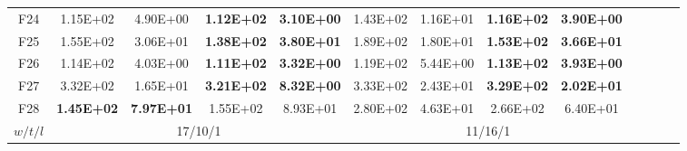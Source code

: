 \begin{table*}[!ht]
\begin{tabular}{|c|cc|cc|cc|cc|cc|cc|}
    F24   & 1.15E+02 & 4.90E+00 & \textbf{1.12E+02} & \textbf{3.10E+00} & 1.43E+02 & 1.16E+01 & \textbf{1.16E+02} & \textbf{3.90E+00} \\
    F25   & 1.55E+02 & 3.06E+01 & \textbf{1.38E+02} & \textbf{3.80E+01} & 1.89E+02 & 1.80E+01 & \textbf{1.53E+02} & \textbf{3.66E+01} \\
    F26   & 1.14E+02 & 4.03E+00 & \textbf{1.11E+02} & \textbf{3.32E+00} & 1.19E+02 & 5.44E+00 & \textbf{1.13E+02} & \textbf{3.93E+00} \\
    F27   & 3.32E+02 & 1.65E+01 & \textbf{3.21E+02} & \textbf{8.32E+00} & 3.33E+02 & 2.43E+01 & \textbf{3.29E+02} & \textbf{2.02E+01} \\
    F28   & \textbf{1.45E+02} & \textbf{7.97E+01} & 1.55E+02 & 8.93E+01 & 2.80E+02 & 4.63E+01 & 2.66E+02 & 6.40E+01 \\
    \cline{1-9}
   $ w/t/l$ & \multicolumn{4}{c|}{17/10/1}   & \multicolumn{4}{c|}{11/16/1} \\
    \cline{1-9}
    \end{tabular}%
  \label{tab:AG_CEC13_advanced10D}%
\end{table*}%

